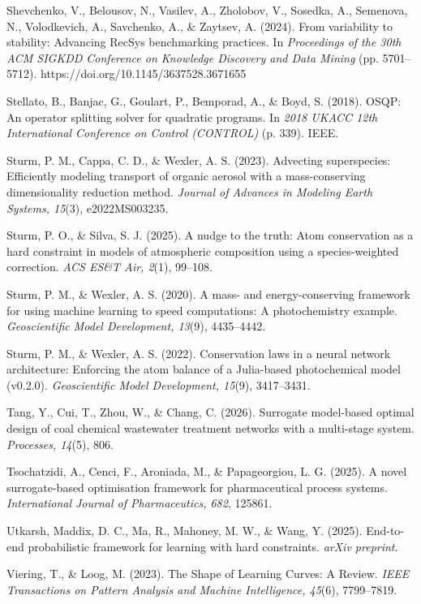 \documentclass[a4paper,fleqn]{cas-sc}
\begin{document}
\noindent Shevchenko, V., Belousov, N., Vasilev, A., Zholobov, V., Sosedka, A., Semenova, N., Volodkevich, A., Savchenko, A., \& Zaytsev, A. (2024). From variability to stability: Advancing RecSys benchmarking practices. In \textit{Proceedings of the 30th ACM SIGKDD Conference on Knowledge Discovery and Data Mining} (pp. 5701--5712). https://doi.org/10.1145/3637528.3671655

\noindent Stellato, B., Banjac, G., Goulart, P., Bemporad, A., \& Boyd, S. (2018). OSQP: An operator splitting solver for quadratic programs. In \textit{2018 UKACC 12th International Conference on Control (CONTROL)} (p. 339). IEEE.

\noindent Sturm, P. M., Cappa, C. D., \& Wexler, A. S. (2023). Advecting superspecies: Efficiently modeling transport of organic aerosol with a mass-conserving dimensionality reduction method. \textit{Journal of Advances in Modeling Earth Systems, 15}(3), e2022MS003235.

\noindent Sturm, P. O., \& Silva, S. J. (2025). A nudge to the truth: Atom conservation as a hard constraint in models of atmospheric composition using a species-weighted correction. \textit{ACS ES\&T Air, 2}(1), 99--108.

\noindent Sturm, P. M., \& Wexler, A. S. (2020). A mass- and energy-conserving framework for using machine learning to speed computations: A photochemistry example. \textit{Geoscientific Model Development, 13}(9), 4435--4442.

\noindent Sturm, P. M., \& Wexler, A. S. (2022). Conservation laws in a neural network architecture: Enforcing the atom balance of a Julia-based photochemical model (v0.2.0). \textit{Geoscientific Model Development, 15}(9), 3417--3431.

\noindent Tang, Y., Cui, T., Zhou, W., \& Chang, C. (2026). Surrogate model-based optimal design of coal chemical wastewater treatment networks with a multi-stage system. \textit{Processes, 14}(5), 806.

\noindent Tsochatzidi, A., Cenci, F., Aroniada, M., \& Papageorgiou, L. G. (2025). A novel surrogate-based optimisation framework for pharmaceutical process systems. \textit{International Journal of Pharmaceutics, 682}, 125861.

\noindent Utkarsh, Maddix, D. C., Ma, R., Mahoney, M. W., \& Wang, Y. (2025). End-to-end probabilistic framework for learning with hard constraints. \textit{arXiv preprint}.

\noindent Viering, T., \& Loog, M. (2023). The Shape of Learning Curves: A Review. \textit{IEEE Transactions on Pattern Analysis and Machine Intelligence, 45}(6), 7799--7819.
\end{document}
